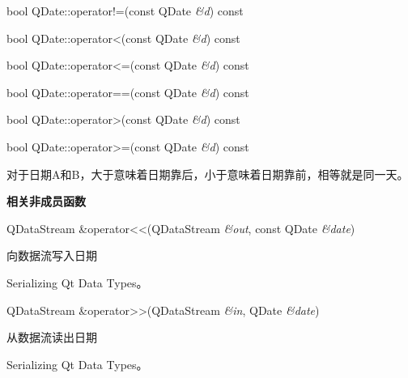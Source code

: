\splitLine

bool QDate::operator!=(const QDate \emph{\&d}) const

bool QDate::operator<(const QDate \emph{\&d}) const

bool QDate::operator<=(const QDate \emph{\&d}) const

bool QDate::operator==(const QDate \emph{\&d}) const

bool QDate::operator>(const QDate \emph{\&d}) const

bool QDate::operator>=(const QDate \emph{\&d}) const

对于日期A和B，大于意味着日期靠后，小于意味着日期靠前，相等就是同一天。

\splitLine

\textbf{相关非成员函数}

QDataStream \&operator<<(QDataStream \emph{\&out}, const QDate \emph{\&date})

向数据流写入日期

\begin{seeAlso}
Serializing Qt Data Types。
\end{seeAlso}

QDataStream \&operator>>(QDataStream \emph{\&in}, QDate \emph{\&date})

从数据流读出日期

\begin{seeAlso}
Serializing Qt Data Types。
\end{seeAlso}